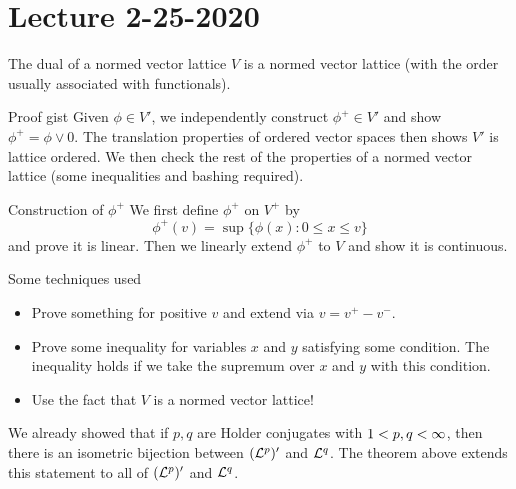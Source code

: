 \section{Lecture 2-25-2020}
\begin{thm}
The dual of a normed vector lattice $V$ is a normed vector lattice (with the order usually associated with functionals).
\end{thm}
\begin{details}{Proof gist}
    Given $\phi \in V'$, we independently construct $\phi^+ \in V'$ and show $\phi^+ = \phi \vee 0$. The translation properties of ordered vector spaces then shows $V'$ is lattice ordered. We then check the rest of the properties of a normed vector lattice (some inequalities and bashing required).
\end{details}
\begin{details}{Construction of $\phi^+$}
We first define $\phi^+$ on $V^+$ by
\[
    \phi^+(v) = \sup\{\phi(x): 0 \leq x \leq v\}
\]
and prove it is linear. Then we linearly extend $\phi^+$ to $V$ and show it is continuous.
\end{details}

\begin{details}{Some techniques used}
\begin{itemize}
    \item Prove something for positive $v$ and extend via $v = v^+ - v^-$.

    \item Prove some inequality for variables $x$ and $y$ satisfying some condition. The inequality holds if we take the supremum over $x$ and $y$ with this condition.

    \item Use the fact that $V$ is a normed vector lattice!
\end{itemize}
\end{details}

\begin{remark}
We already showed that if $p,q$ are Holder conjugates with $1 < p,q < \infty$, then there is an isometric bijection between $({\mathcal L}^p)'$ and ${\mathcal L}^q$. The theorem above extends this statement to all of $({\mathcal L}^p)'$ and ${\mathcal L}^q$.
\end{remark}
